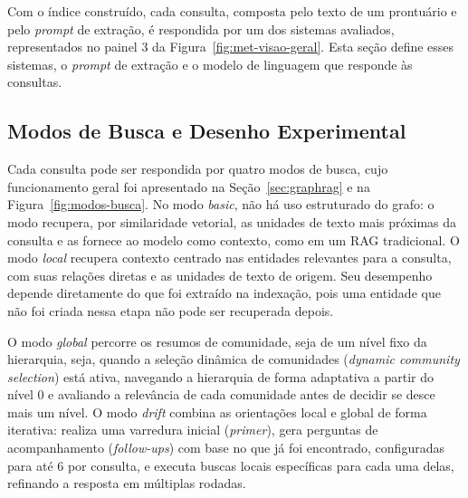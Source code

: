 Com o índice construído, cada consulta, composta pelo texto de um prontuário e pelo \textit{prompt} de extração, é respondida por um dos sistemas avaliados, representados no painel 3 da Figura~\ref{fig:met-visao-geral}. Esta seção define esses sistemas, o \textit{prompt} de extração e o modelo de linguagem que responde às consultas.

\subsection{Modos de Busca e Desenho Experimental}\label{sec:met-desenho}

Cada consulta pode ser respondida por quatro modos de busca, cujo funcionamento geral foi apresentado na Seção~\ref{sec:graphrag} e na Figura~\ref{fig:modos-busca}. No modo \textit{basic}, não há uso estruturado do grafo: o modo recupera, por similaridade vetorial, as unidades de texto mais próximas da consulta e as fornece ao modelo como contexto, como em um RAG tradicional.
O modo \textit{local} recupera contexto centrado nas entidades relevantes para a consulta, com suas relações diretas e as unidades de texto de origem. Seu desempenho depende diretamente do que foi extraído na indexação, pois uma entidade que não foi criada nessa etapa não pode ser recuperada depois.

O modo \textit{global} percorre os resumos de comunidade, seja de um nível fixo da hierarquia, seja, quando a seleção dinâmica de comunidades (\textit{dynamic community selection}) está ativa, navegando a hierarquia de forma adaptativa a partir do nível 0 e avaliando a relevância de cada comunidade antes de decidir se desce mais um nível. O modo \textit{drift} combina as orientações local e global de forma iterativa: realiza uma varredura inicial (\textit{primer}), gera perguntas de acompanhamento (\textit{follow-ups}) com base no que já foi encontrado, configuradas para até 6 por consulta, e executa buscas locais específicas para cada uma delas, refinando a resposta em múltiplas rodadas.

